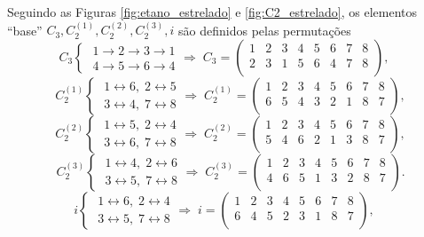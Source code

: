 \documentclass[a4paper,10pt]{article}
\newcommand{\lr}{\leftrightarrow}
\begin{document}
Seguindo as Figuras \ref{fig:etano_estrelado} e \ref{fig:C2_estrelado}, os elementos ``base'' $C_3, C_2^{(1)}, C_2^{(2)}, C_2^{(3)}, i$ são definidos pelas permutações
$$
C_3
\begin{cases}
\; 1 \to 2 \to 3 \to 1 \\
\; 4 \to 5 \to 6 \to 4
\end{cases}
\Rightarrow \;
C_3 =
\begin{pmatrix}
1 & 2 & 3 & 4 & 5 & 6 & 7 & 8 \\
2 & 3 & 1 & 5 & 6 & 4 & 7 & 8 \\
\end{pmatrix}, \quad
$$
$$
C_2^{(1)}
\begin{cases}
\; 1 \lr 6, \; 2 \lr 5 \\
\; 3 \lr 4, \; 7 \lr 8
\end{cases}
\Rightarrow \;
C_2^{(1)} =
\begin{pmatrix}
1 & 2 & 3 & 4 & 5 & 6 & 7 & 8 \\
6 & 5 & 4 & 3 & 2 & 1 & 8 & 7 \\
\end{pmatrix},
$$
$$
C_2^{(2)}
\begin{cases}
\; 1 \lr 5, \; 2 \lr 4 \\
\; 3 \lr 6, \; 7 \lr 8
\end{cases}
\Rightarrow \;
C_2^{(2)} =
\begin{pmatrix}
1 & 2 & 3 & 4 & 5 & 6 & 7 & 8 \\
5 & 4 & 6 & 2 & 1 & 3 & 8 & 7 \\
\end{pmatrix},
$$
$$
C_2^{(3)}
\begin{cases}
\; 1 \lr 4, \; 2 \lr 6 \\
\; 3 \lr 5, \; 7 \lr 8
\end{cases}
\Rightarrow \;
C_2^{(3)} =
\begin{pmatrix}
1 & 2 & 3 & 4 & 5 & 6 & 7 & 8 \\
4 & 6 & 5 & 1 & 3 & 2 & 8 & 7 \\
\end{pmatrix}.
$$
$$
i
\begin{cases}
\; 1 \lr 6, \; 2 \lr 4 \\
\; 3 \lr 5, \; 7 \lr 8
\end{cases}
\Rightarrow \;
i =
\begin{pmatrix}
1 & 2 & 3 & 4 & 5 & 6 & 7 & 8 \\
6 & 4 & 5 & 2 & 3 & 1 & 8 & 7 \\
\end{pmatrix}, \quad
$$
\end{document}
